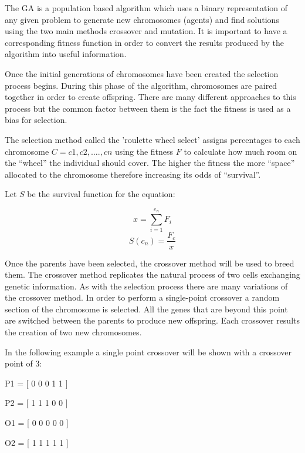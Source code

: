 \documentclass{AISB2008}
\begin{document}
The GA is a population based algorithm which uses a binary representation of any given problem to generate new chromosomes (agents) and find solutions using the two main methods crossover and mutation. It is important to have a corresponding fitness function in order to convert the results produced by the algorithm into useful information. 

Once the initial generations of chromosomes have been created the selection process begins. During this phase of the algorithm, chromosomes are paired together in order to create offspring. There are many different approaches to this process but the common factor between them is the fact the fitness is used as a bias for selection.

The selection method called the 'roulette wheel select' assigns percentages to each chromosome {$C = {c1,c2,….,cn}$} using the fitness {$F$} to calculate how much room on the “wheel” the individual should cover. The higher the fitness the more “space” allocated to the chromosome therefore increasing its odds of “survival”.

Let {$S$} be the survival function for the equation:

\begin{equation}
x = \sum\limits_{i=1}^{e_n} {F_i} 
\end{equation}
\begin{equation}
S(c_n) = \frac {F_c }{x}
\end{equation}

Once the parents have been selected, the crossover method will be used to breed them. The crossover method replicates the natural process of two cells exchanging genetic information. As with the selection process there are many variations of the crossover method. In order to perform a single-point crossover a random section of the chromosome is selected. All the genes that are beyond this point are switched between the parents to produce new offspring. Each crossover results the creation of two new chromosomes.

In the following example a single point crossover will be shown with a crossover point of 3:

\begin{center}
P1 = [ 0 0 0 {\color{red} 1 1}  ]
\end{center}
\begin{center}
P2 = [ 1 1 1 {\color{blue} 0 0}  ]
\end{center}
\begin{center}
O1 = [ 0 0 0 {\color{blue} 0 0}  ]
\end{center}
\begin{center}
O2 = [ 1 1 1 {\color{red} 1 1}  ]
\end{center}
\end{document}
